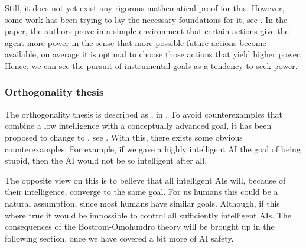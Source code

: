 \documentclass[12pt,A4]{report}
\theoremstyle{definition}
\begin{document}

Still, it does not yet exist any rigorous mathematical proof for this. However, some work has been trying to lay the necessary foundations for it, see \citet{Turner19a}. In the paper, the authors prove in a simple environment that certain actions give the agent more power in the sense that more possible future actions become available, on average it is optimal to choose those actions that yield higher power. Hence, we can see the pursuit of instrumental goals as a tendency to seek power.


\subsubsection{Orthogonality thesis}
The orthogonality thesis is described as , in \citet{Bostrom12}. To avoid counterexamples that combine a low intelligence with a conceptually advanced goal, it has been proposed to change  to , see \citet{Haggstrom19}. With this, there exists some obvious counterexamples. For example, if we gave a highly intelligent AI the goal of being stupid, then the AI would not be so intelligent after all.

The opposite view on this is to believe that all intelligent AIs will, because of their intelligence, converge to the same goal. For us humans this could be a natural assumption, since most humans have similar goals. Although, if this where true it would be impossible to control all sufficiently intelligent AIs. The consequences of the Bostrom-Omohundro theory will be brought up in the following section, once we have covered a bit more of AI safety.

\end{document}
